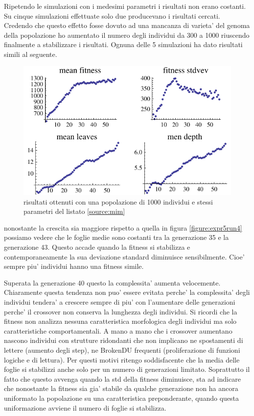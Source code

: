 \documentclass[12pt, a4paper]{article}
\begin{document}
Ripetendo le simulazioni con i medesimi parametri i risultati non erano costanti. Su cinque simulazioni effettuate solo due producevano i risultati cercati.
Credendo che questo effetto fosse dovuto ad una mancanza di varieta' del genoma della popolazione ho aumentato il numero degli individui da 300 a 1000 riuscendo finalmente a stabilizzare i risultati. Ognuna delle 5 simulazioni ha dato risultati simili al seguente.

\begin{figure}[!h]
\begin{center}
\includegraphics[width=12.0cm]{expr5_run6.pdf}
\caption{risultati ottenuti con una popolazione di 1000 individui e stessi parametri del listato \ref{source:mim}} 
\label{figure:expr5run6}
\end{center}
\end{figure}

nonostante la crescita sia maggiore rispetto a quella in figura \ref{figure:expr5run4} possiamo vedere che le foglie medie sono costanti tra la generazione 35 e la generazione 43.
Questo accade quando la fitness si stabilizza e contemporaneamente la sua deviazione standard diminuisce sensibilmente. Cioe' sempre piu' individui hanno una fitness simile.

Superata la generazione 40 questo la complessita' aumenta velocemente. Chiaramente questa tendenza non puo' essere evitata perche' la complessita' degli individui tendera' a crescere sempre di piu' con l'aumentare delle generazioni perche' il crossover non conserva la lunghezza degli individui. Si ricordi che la fitness non analizza nessuna caratteristica morfologica degli individui ma solo caratteristiche comportamentali. A mano a mano che i crossover aumentano nascono individui con strutture ridondanti che non implicano ne spostamenti di lettere (aumento degli step), ne BrokenDU frequenti (proliferazione di funzioni logiche e di lettura). Per questi motivi ritengo soddisfacente che la media delle foglie si stabilizzi anche solo per un numero di generazioni limitato. Soprattutto il fatto che questo avvenga quando la std della fitness diminuisce, sta ad indicare che nonostante la fitness sia gia' stabile da qualche generazione non ha ancora uniformato la popolazione su una caratteristica preponderante, quando questa uniformazione avviene il numero di foglie si stabilizza.
\end{document}
